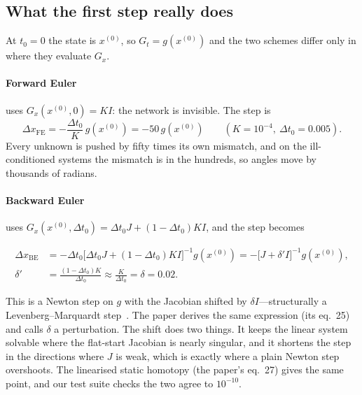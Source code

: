 \documentclass[11pt,a4paper]{article}
\newcommand{\xo}{x^{(0)}}
\begin{document}
\subsection{What the first step really does}\label{sec:firststep}
At $t_0=0$ the state is $\xo$, so $G_t = g(\xo)$ and the two schemes differ only in where they evaluate $G_x$.

\paragraph{Forward Euler} uses $G_x(\xo,0)=KI$: the network is invisible. The step is
\begin{equation}
  \Delta x_{\mathrm{FE}} = -\frac{\Delta t_0}{K}\,g(\xo) = -50\,g(\xo) \qquad(K=10^{-4},\ \Delta t_0=0.005).
\end{equation}
Every unknown is pushed by fifty times its own mismatch, and on the ill-conditioned systems the
mismatch is in the hundreds, so angles move by thousands of radians.

\paragraph{Backward Euler} uses $G_x(\xo,\Delta t_0) = \Delta t_0 J + (1-\Delta t_0)KI$, and the step becomes
\begin{keyeq}
\begin{equation}
\begin{aligned}
  \Delta x_{\mathrm{BE}} &= -\Delta t_0\bigl[\Delta t_0 J + (1-\Delta t_0)KI\bigr]^{-1} g(\xo)
    = -\bigl[J + \delta' I\bigr]^{-1} g(\xo),\\[2pt]
  \delta' &= \frac{(1-\Delta t_0)K}{\Delta t_0} \approx \frac{K}{\Delta t_0} = \delta = 0.02.
\end{aligned}\label{eq:shift}
\end{equation}
\end{keyeq}
This is a Newton step on $g$ with the Jacobian shifted by $\delta I$---structurally a Levenberg--Marquardt
step~\cite{levenberg1944,marquardt1963}. The paper derives the same expression (its eq.~25) and calls
$\delta$ a perturbation. The shift does two things. It keeps the linear system solvable where the
flat-start Jacobian is nearly singular, and it shortens the step in the directions where $J$ is weak,
which is exactly where a plain Newton step overshoots. The linearised static homotopy (the paper's eq.~27)
gives the same point, and our test suite checks the two agree to $10^{-10}$.
\end{document}
